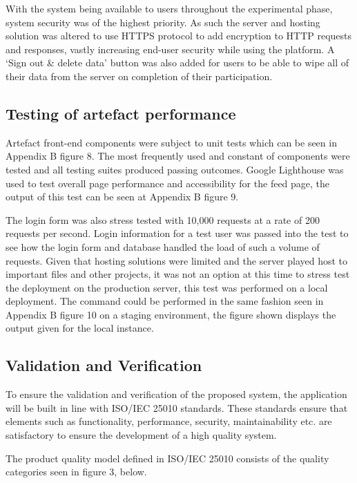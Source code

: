 \documentclass[lettersize,journal]{IEEEtran}
\begin{document}
	With the system being available to users throughout the experimental phase, system security was of the highest priority. As such the server and hosting solution was altered to use HTTPS protocol
	 to add encryption to HTTP requests and responses, vastly increasing end-user security while using the platform. 
	 A `Sign out \& delete data' button was also added for users to be able to wipe all of their data from the server on completion of their participation.
       
       \subsection{Testing of artefact performance}
      Artefact front-end components were subject to unit tests which can be seen in Appendix B figure 8. The most frequently used and constant of components were tested and all testing suites produced
      passing outcomes. Google Lighthouse was used to test overall page performance and accessibility for the feed page, the output of this test can be seen at Appendix B figure 9.

      The login form was also stress tested with 10,000 requests at a rate of 200 requests per second. Login information for a test user was passed into the test to see how the login form and 
      database handled the load of such a volume of requests. Given that hosting solutions were limited and the server played host to important files and other projects, it was not an option at
      this time to stress test the deployment on the production server, this test was performed on a local deployment. The command could be performed in the same fashion seen in
      Appendix B figure 10 on a staging environment, the figure shown displays the output given for the local instance.

        \subsection{Validation and Verification}

        To ensure the validation and verification of the proposed system, the application will be built in line with ISO/IEC 25010 \cite{ISO25000} standards.
        These standards ensure that elements such as functionality, performance, security, maintainability etc. are satisfactory to ensure the development of a high quality system.

        The product quality model defined in ISO/IEC 25010 consists of the quality categories seen in figure 3, below.
\end{document}
